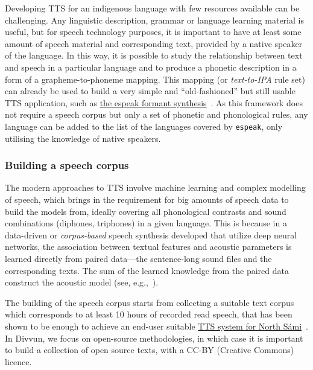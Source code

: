 \documentclass[free]{flammie}
\begin{document}
Developing TTS for an indigenous language with few resources available can be
challenging. Any linguistic description, grammar or language learning material
is useful, but for speech technology purposes, it is important to have at least
some amount of speech material and corresponding text, provided by a native
speaker of the language. In this way, it is possible to study the relationship
between text and speech in a particular language and to produce a phonetic
description in a form of a grapheme-to-phoneme mapping. This mapping (or
\textit{text-to-IPA} rule set) can already be used to build a very simple and
``old-fashioned'' but still usable TTS application, such as
\href{https://github.com/espeak-ng}{the espeak formant
synthesis}~\cite{kastrati2014opportunity,pronk2013adding}. As this framework
does not require a speech corpus but only a set of phonetic and phonological
rules, any language can be added to the list of the languages covered by
\texttt{espeak}, only utilising the knowledge of native speakers.


\subsubsection{Building a speech corpus}

The modern approaches to TTS involve machine learning and complex modelling of
speech, which brings in the requirement for big amounts of speech data to build
the models from, ideally covering all phonological contrasts and sound
combinations (diphones, triphones) in a given language. This is because in a
data-driven or \textit{corpus-based} speech synthesis developed that utilize
deep neural networks, the association between textual features and acoustic
parameters is learned directly from paired data---the sentence-long sound files
and the corresponding texts. The sum of the learned knowledge from the paired
data construct the acoustic model (see, e.g.,~\cite{watts2016hmms}).



The building of the speech corpus starts from collecting a suitable text corpus
which corresponds to at least 10 hours of recorded read speech, that has been
shown to be enough to achieve an end-user suitable
\href{https://github.com/divvun/lang-sme-ml-speech}{TTS system for North
Sámi}~\cite{makashova2021speech}. In Divvun, we focus on open-source
methodologies, in which case it is important to build a collection of open
source texts, with a CC-BY (Creative Commons) licence.
\end{document}

